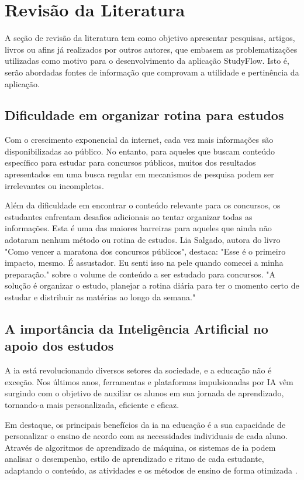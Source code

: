 \chapter{Revisão da Literatura}


A seção de revisão da literatura tem como objetivo apresentar pesquisas, artigos, livros ou afins já realizados por outros autores, que embasem as problematizações utilizadas como motivo para o desenvolvimento da aplicação StudyFlow. Isto é, serão abordadas fontes de informação que comprovam a utilidade e pertinência da aplicação.

\section{Dificuldade em organizar rotina para estudos}

Com o crescimento exponencial da internet, cada vez mais informações são disponibilizadas ao público. No entanto, para aqueles que buscam conteúdo específico para estudar para concursos públicos, muitos dos resultados apresentados em uma busca regular em mecanismos de pesquisa podem ser irrelevantes ou incompletos.

Além da dificuldade em encontrar o conteúdo relevante para os concursos, os estudantes enfrentam desafios adicionais ao tentar organizar todas as informações. Esta é uma das maiores barreiras para aqueles que ainda não adotaram nenhum método ou rotina de estudos. Lia Salgado, autora do livro "Como vencer a maratona dos concursos públicos", destaca: "Esse é o primeiro impacto, mesmo. É assustador. Eu senti isso na pele quando comecei a minha preparação." sobre o volume de conteúdo a ser estudado para concursos. "A solução é organizar o estudo, planejar a rotina diária para ter o momento certo de estudar e distribuir as matérias ao longo da semana."

\section{A importância da Inteligência Artificial no apoio dos estudos}

A \ac{ia} está revolucionando diversos setores da sociedade, e a educação não é exceção. Nos últimos anos, ferramentas e plataformas impulsionadas por IA vêm surgindo com o objetivo de auxiliar os alunos em sua jornada de aprendizado, tornando-a mais personalizada, eficiente e eficaz.


Em destaque, os principais benefícios da \acs{ia} na educação é a sua capacidade de personalizar o ensino de acordo com as necessidades individuais de cada aluno. Através de algoritmos de aprendizado de máquina, os sistemas de \acs{ia} podem analisar o desempenho, estilo de aprendizado e ritmo de cada estudante, adaptando o conteúdo, as atividades e os métodos de ensino de forma otimizada \cite{shemshack2020systematic}.


